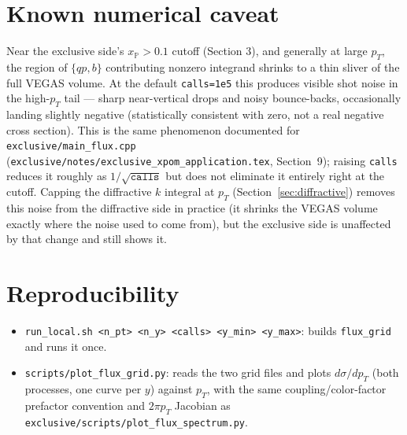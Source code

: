\documentclass[11pt]{article}
\begin{document}
\section{Known numerical caveat}

Near the exclusive side's $x_{\mathbb P}>0.1$ cutoff (Section 3), and
generally at large $p_T$, the region of $\{qp,b\}$ contributing nonzero
integrand shrinks to a thin sliver of the full VEGAS volume. At the
default \texttt{calls=1e5} this produces visible shot noise in the
high-$p_T$ tail — sharp near-vertical drops and noisy bounce-backs,
occasionally landing slightly negative (statistically consistent with
zero, not a real negative cross section). This is the same phenomenon
documented for \texttt{exclusive/main\_flux.cpp}
(\texttt{exclusive/notes/exclusive\_xpom\_application.tex}, Section~9);
raising \texttt{calls} reduces it roughly as $1/\sqrt{\texttt{calls}}$ but
does not eliminate it entirely right at the cutoff. Capping the
diffractive $k$ integral at $p_T$ (Section~\ref{sec:diffractive}) removes
this noise from the diffractive side in practice (it shrinks the VEGAS
volume exactly where the noise used to come from), but the exclusive side
is unaffected by that change and still shows it.

\section{Reproducibility}

\begin{itemize}
\item \texttt{run\_local.sh <n\_pt> <n\_y> <calls> <y\_min> <y\_max>}:
builds \texttt{flux\_grid} and runs it once.
\item \texttt{scripts/plot\_flux\_grid.py}: reads the two grid files and
plots $d\sigma/dp_T$ (both processes, one curve per $y$) against $p_T$,
with the same coupling/color-factor prefactor convention and $2\pi p_T$
Jacobian as \texttt{exclusive/scripts/plot\_flux\_spectrum.py}.
\end{itemize}
\end{document}
